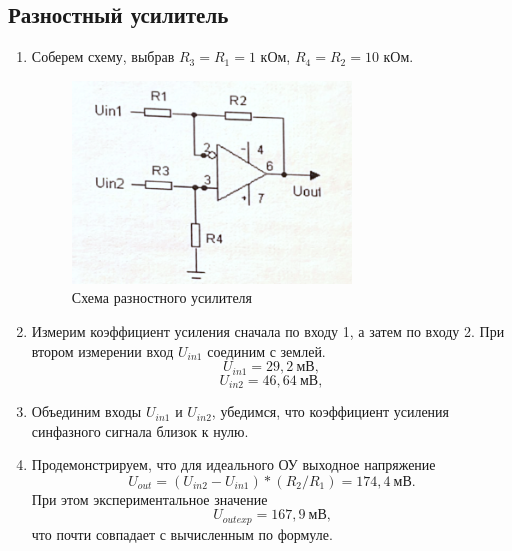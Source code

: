 \documentclass[a4paper, 12pt]{article}%
\begin{document}
\newpage
\subsection{Разностный усилитель}

\begin{enumerate}

\item Соберем схему, выбрав $R_3 = R_1 = 1$ кОм, $R_4 = R_2=10$ кОм.

\begin{figure}[h]
\begin{center}
\includegraphics[width = 0.7\textwidth]{scheme4.png}
\caption{Схема разностного усилителя}
\end{center}
\end{figure}

\item Измерим коэффициент усиления сначала по входу 1, а затем по входу 2. При втором измерении вход $U_{in1}$ соединим с землей.
\[U_{in1} = 29,2 \: \text{мВ},\]
\[U_{in2} = 46,64 \: \text{мВ},\]
\item Объединим входы $U_{in1}$ и $U_{in2}$, убедимся, что коэффициент усиления синфазного сигнала близок к нулю.
\item Продемонстрируем, что для идеального ОУ выходное напряжение
\[U_{out} = (U_{in2}-U_{in1})*(R_2 / R_1)=174,4 \: \text{мВ.}\]
При этом экспериментальное значение 
\[U_{out exp} = 167,9 \: \text{мВ,}\]
что почти совпадает с вычисленным по формуле.

\end{enumerate}
\end{document}
